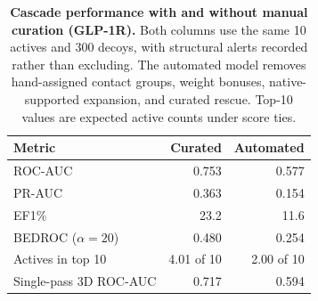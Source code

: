 \begin{table}[tbp]
\centering
\caption{\textbf{Cascade performance with and without manual curation (GLP-1R).} Both columns use the same 10 actives and 300 decoys, with structural alerts recorded rather than excluding. The automated model removes hand-assigned contact groups, weight bonuses, native-supported expansion, and curated rescue. Top-10 values are expected active counts under score ties.}
\label{tab:ablation_curation}
\footnotesize
\setlength{\tabcolsep}{4pt}
\begin{tabular}{@{}lrr@{}}
\toprule
Metric & Curated & Automated \\
\midrule
ROC-AUC & 0.753 & 0.577 \\
PR-AUC & 0.363 & 0.154 \\
EF1\% & 23.2 & 11.6 \\
BEDROC ($\alpha=20$) & 0.480 & 0.254 \\
Actives in top 10 & 4.01 of 10 & 2.00 of 10 \\
Single-pass 3D ROC-AUC & 0.717 & 0.594 \\
\bottomrule
\end{tabular}
\end{table}
